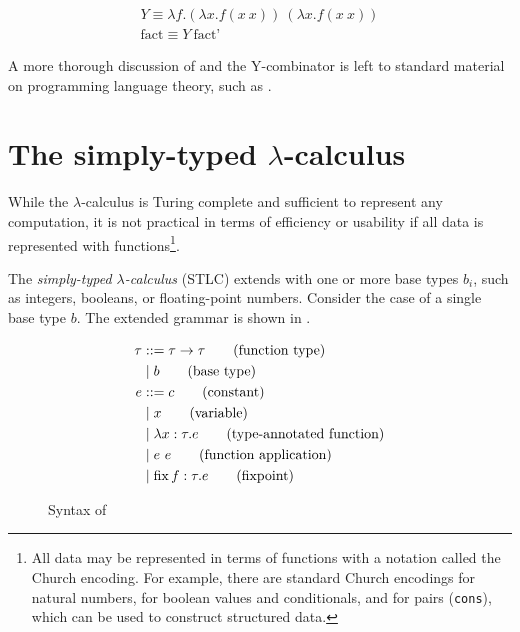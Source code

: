 \begin{singlespace}
  \begin{gather*}
    Y\equiv\lambda f.(\lambda x.f(x\ x))\ (\lambda x.f(x\ x)) \\
    \text{fact}\equiv Y\ \text{fact'}
  \end{gather*}
\end{singlespace}

A more thorough discussion of \ulc{} and the Y-combinator is left to standard material on programming language theory, such as \cite{harper2016practical}.

\section{The simply-typed $\lambda$-calculus}
\label{sec:stlc}

While the $\lambda$-calculus is Turing complete and sufficient to represent any computation, it is not practical in terms of efficiency or usability if all data is represented with functions\footnote{All data may be represented in terms of functions with a notation called the Church encoding. For example, there are standard Church encodings for natural numbers, for boolean values and conditionals, and for pairs (\texttt{cons}), which can be used to construct structured data.}.

The \textit{simply-typed $\lambda$-calculus} (STLC) \stlc{} extends \ulc{} with one or more base types $b_i$, such as integers, booleans, or floating-point numbers. Consider the case of a single base type $b$. The extended grammar is shown in .

\begin{figure}
  \centering
  \begin{mdframed}
    \begin{singlespace}
      \begin{align*}
        \tau &::=\tau\to\tau\tag{function type} \\
             &\mid b\tag{base type} \\
        e &::= c\tag{constant} \\
             &\mid x\tag{variable} \\
             &\mid\lambda x:\tau.e\tag{type-annotated function} \\
             &\mid e\ e\tag{function application} \\
             &\mid \operatorname{fix} f:\tau.e\tag{fixpoint}
      \end{align*}
    \end{singlespace}
  \end{mdframed}
  \caption{Syntax of \stlc}
  \label{fig:syntax-gtlc}
\end{figure}

